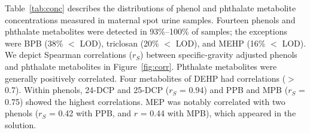 Table~\ref{tab:conc} describes the distributions of phenol and phthalate metabolite concentrations measured in maternal spot urine samples. Fourteen phenols and phthalate metabolites were detected in 93\%--100\% of samples; the exceptions were BPB (38\% $<$ LOD), triclosan (20\% $<$ LOD), and MEHP (16\% $<$ LOD). We depict Spearman correlations ($r_S$) between specific-gravity adjusted phenols and phthalate metabolites in Figure~\ref{fig:corr}. Phthalate metabolites were generally positively correlated. Four metabolites of DEHP had correlations ($>$ 0.7). Within phenols, 24-DCP and 25-DCP ($r_S$ = 0.94) and PPB and MPB ($r_S$ = 0.75) showed the highest correlations. MEP was notably correlated with two phenols ($r_S$ = 0.42 with PPB, and $r$ = 0.44 with MPB), which appeared in the \bnmf solution. \\

